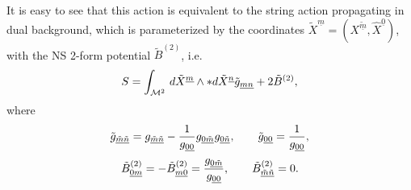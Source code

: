 \documentclass[a4paper,11pt]{article}
\begin{document}
It is easy to see that this action is equivalent to the string action
propagating in dual background, which is parameterized by the coordinates
${\tilde X}^{\underline m}=(X^{\underline{\tilde m}},{\hat X}^{\underline
0})$, with the NS 2-form potential ${\tilde B}^{(2)}$, i.e.
\begin{equation}\plabel{A2D}
S=\int_{{\cal M}^2}\, d{\tilde X}^{\underline m}\wedge \ast
d{\tilde X}^{\underline n}{\tilde g}_{\underline{mn}}+2{\tilde B}^{(2)},
\end{equation}
where \cite{buscher}
$$
{\tilde g}_{\underline{\tilde m}\underline{\tilde n}}=
g_{\underline{\tilde m}\underline{\tilde n}}-{1\over g_{\underline{00}}}
g_{\underline{0}\underline{\tilde m}}g_{\underline{0}\underline{\tilde
n}},\qquad {\tilde g}_{\underline{00}}={1\over g_{\underline{00}}},
$$
\begin{equation}\plabel{TR}
{\tilde B}^{(2)}_{\underline{0}\underline{m}}=
-{\tilde B}^{(2)}_{\underline{m}\underline{0}}=
{g_{\underline{0}\underline{\tilde m}}\over g_{\underline{00}}}, \qquad
{\tilde B}^{(2)}_{\underline{\tilde m}\underline{\tilde n}}=0.
\end{equation}
\end{document}
